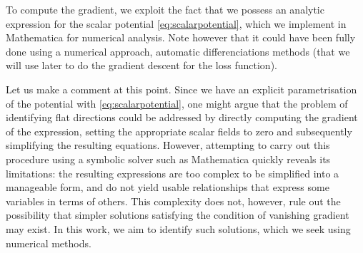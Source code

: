 \documentclass[11pt]{article}
\begin{document}
To compute the gradient, we exploit the fact that we possess an analytic expression for the scalar potential \eqref{eq:scalarpotential}, which we implement in Mathematica for numerical analysis. Note however that it could have been fully done using a numerical approach, automatic differenciations methods (that we will use later to do the gradient descent for the loss function).

Let us make a comment at this point. Since we have an explicit parametrisation of the potential with \eqref{eq:scalarpotential}, one might argue that the problem of identifying flat directions could be addressed by directly computing the gradient of the expression, setting the appropriate scalar fields to zero and subsequently simplifying the resulting equations. However, attempting to carry out this procedure using a symbolic solver such as Mathematica quickly reveals its limitations: the resulting expressions are too complex to be simplified into a manageable form, and do not yield usable relationships that express some variables in terms of others. This complexity does not, however, rule out the possibility that simpler solutions satisfying the condition of vanishing gradient may exist. In this work, we aim to identify such solutions, which we seek using numerical methods. 
\end{document}
